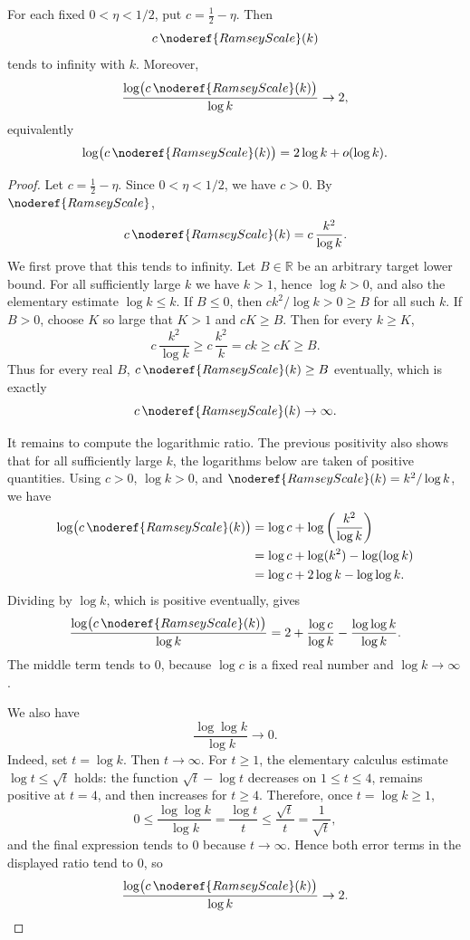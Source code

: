 \begin{lemma}
For each fixed \(0<\eta<1/2\), put \(c=\frac12-\eta\).  Then
\[
c\,\noderef{RamseyScale}(k)
\]
tends to infinity with \(k\).  Moreover,
\[
\frac{\log\bigl(c\,\noderef{RamseyScale}(k)\bigr)}{\log k}\to 2,
\]
equivalently
\[
\log\bigl(c\,\noderef{RamseyScale}(k)\bigr)=2\log k+o(\log k).
\]
\end{lemma}
\begin{proof}
Let \(c=\frac12-\eta\).  Since \(0<\eta<1/2\), we have \(c>0\).
By \(\noderef{RamseyScale}\),
\[
c\,\noderef{RamseyScale}(k)
=c\,\frac{k^2}{\log k}.
\]
We first prove that this tends to infinity.  Let \(B\in\mathbb R\) be an
arbitrary target lower bound.  For all sufficiently large \(k\) we have
\(k>1\), hence \(\log k>0\), and also the elementary estimate
\(\log k\le k\).  If \(B\le0\), then
\(c k^2/\log k>0\ge B\) for all such \(k\).  If \(B>0\), choose \(K\) so large
that \(K>1\) and \(cK\ge B\).  Then for every \(k\ge K\),
\[
c\,\frac{k^2}{\log k}\ge c\,\frac{k^2}{k}=ck\ge cK\ge B.
\]
Thus for every real \(B\), \(c\,\noderef{RamseyScale}(k)\ge B\) eventually,
which is exactly
\[
c\,\noderef{RamseyScale}(k)\to\infty.
\]

It remains to compute the logarithmic ratio.  The previous positivity also
shows that for all sufficiently large \(k\), the logarithms below are taken of
positive quantities.  Using \(c>0\), \(\log k>0\), and
\(\noderef{RamseyScale}(k)=k^2/\log k\), we have
\[
\begin{aligned}
\log\bigl(c\,\noderef{RamseyScale}(k)\bigr)
&=\log c+\log\left(\frac{k^2}{\log k}\right)\\
&=\log c+\log(k^2)-\log(\log k)\\
&=\log c+2\log k-\log\log k.
\end{aligned}
\]
Dividing by \(\log k\), which is positive eventually, gives
\[
\frac{\log\bigl(c\,\noderef{RamseyScale}(k)\bigr)}{\log k}
=2+\frac{\log c}{\log k}
 -\frac{\log\log k}{\log k}.
\]
The middle term tends to \(0\), because \(\log c\) is a fixed real number and
\(\log k\to\infty\).

We also have
\[
\frac{\log\log k}{\log k}\to0.
\]
Indeed, set \(t=\log k\).  Then \(t\to\infty\).  For \(t\ge1\), the elementary
calculus estimate \(\log t\le\sqrt t\) holds: the function
\(\sqrt t-\log t\) decreases on \(1\le t\le4\), remains positive at \(t=4\),
and then increases for \(t\ge4\).  Therefore, once \(t=\log k\ge1\),
\[
0\le\frac{\log\log k}{\log k}
=\frac{\log t}{t}
\le \frac{\sqrt t}{t}
=\frac1{\sqrt t},
\]
and the final expression tends to \(0\) because \(t\to\infty\).  Hence both
error terms in the displayed ratio tend to \(0\), so
\[
\frac{\log\bigl(c\,\noderef{RamseyScale}(k)\bigr)}{\log k}\to2.
\]
\end{proof}

